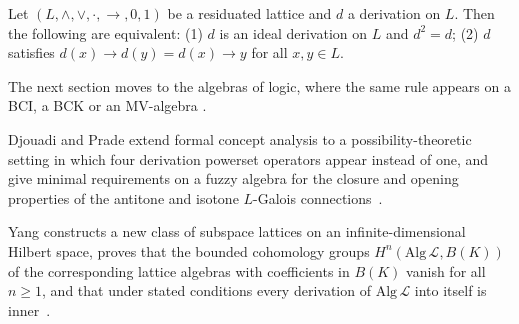 \begin{theorem}\label{thm:other:he-xin-zhan}
Let $(L, \wedge, \vee, \cdot, \to, 0, 1)$ be a residuated lattice and $d$
a derivation on $L$. Then the following are equivalent: \textup{(1)} $d$
is an ideal derivation on $L$ and $d^{2} = d$; \textup{(2)} $d$ satisfies
$d(x) \to d(y) = d(x) \to y$ for all $x, y \in L$.
\end{theorem}

The next section moves to the algebras of logic, where the same rule
appears on a BCI, a BCK or an MV-algebra
\cite[p.~167]{JunXin2004}.

Djouadi and Prade extend formal concept analysis to a possibility-theoretic setting in which four derivation powerset operators appear instead of one, and give minimal requirements on a fuzzy algebra for the closure and opening properties of the antitone and isotone $L$-Galois connections~\cite{WlPossibilityTheoreticExtensionO2011}.

Yang constructs a new class of subspace lattices on an infinite-dimensional Hilbert space, proves that the bounded cohomology groups $H^n(\mathrm{Alg}\,\mathcal{L},B(K))$ of the corresponding lattice algebras with coefficients in $B(K)$ vanish for all $n\geq 1$, and that under stated conditions every derivation of $\mathrm{Alg}\,\mathcal{L}$ into itself is inner~\cite{WlCohomologyGroupsAndLieDerivati2025}.


